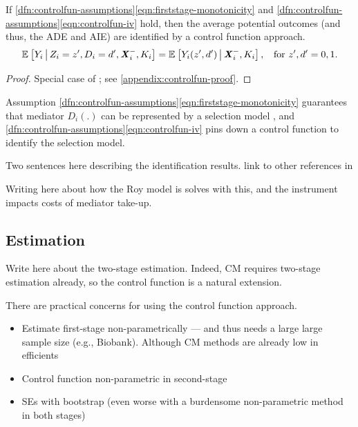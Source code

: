 \begin{theorem}
    \label{thm:controlfun}
    If \ref{dfn:controlfun-assumptions}\eqref{eqn:firststage-monotonicity} and \ref{dfn:controlfun-assumptions}\eqref{eqn:controlfun-iv} hold, then the average potential outcomes (and thus, the ADE and AIE) are identified by a control function approach.
    \[ \mathbb{E}_{} \left[ Y_i \, \middle\vert \, Z_i = z', D_i = d', \boldsymbol{\mathit{X}}_i^-, K_i \right]
        = \mathbb{E}_{} \left[ Y_i(z', d') \, \middle\vert \, \boldsymbol{\mathit{X}}_i^-, K_i \right]
        , \;\; \text{ for } z', d' = 0,1. \]
\end{theorem}
\begin{proof}
    Special case of \citet[Theorem~1]{imbens2009identification}; see \autoref{appendix:controlfun-proof}.
\end{proof}

Assumption \ref{dfn:controlfun-assumptions}\eqref{eqn:firststage-monotonicity} guarantees that mediator $D_i(.)$ can be represented by a selection model \citep{vytlacil2002independence}, and \ref{dfn:controlfun-assumptions}\eqref{eqn:controlfun-iv} pins down a control function to identify the selection model.

Two sentences here describing the identification results.
link to other references in 

Writing here about how the Roy model is solves with this, and the instrument impacts costs of mediator take-up.


\subsection{Estimation}




Write here about the two-stage estimation.
Indeed, CM requires two-stage estimation already, so the control function is a natural extension.

There are practical concerns for using the control function approach.
\begin{itemize}
    \item Estimate first-stage non-parametrically --- and thus needs a large large sample size (e.g., Biobank).  Although CM methods are already low in efficients
    \item Control function non-parametric in second-stage
    \item SEs with bootstrap (even worse with a burdensome non-parametric method in both stages)
\end{itemize}

